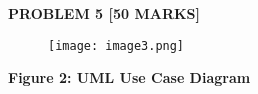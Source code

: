 \documentclass[12pt]{article}
\begin{document}
\vspace{\baselineskip}

\vspace{\baselineskip}

\vspace{\baselineskip}

\vspace{\baselineskip}

\vspace{\baselineskip}
\begin{justify}
\textbf{PROBLEM 5 [50 MARKS]}
\end{justify}\par


\vspace{\baselineskip}



\begin{figure}[H]
	\begin{Center}
		\texttt{[image: image3.png]}
	\end{Center}
\end{figure}



\par


\vspace{\baselineskip}
\begin{Center}
\textbf{Figure 2: UML Use Case Diagram}
\end{Center}\par


\vspace{\baselineskip}

\vspace{\baselineskip}

\vspace{\baselineskip}

\vspace{\baselineskip}

\vspace{\baselineskip}

\vspace{\baselineskip}

\vspace{\baselineskip}

\vspace{\baselineskip}

\vspace{\baselineskip}
\end{document}
